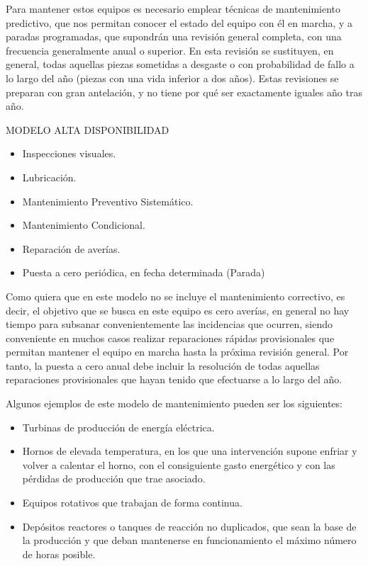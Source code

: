 \documentclass[../main]{subfiles}
\begin{document}
Para mantener
estos equipos es necesario emplear técnicas de mantenimiento predictivo,
que nos permitan conocer el estado del equipo con él en marcha, y a paradas
programadas, que supondrán una revisión general completa, con una frecuencia generalmente anual o superior. En esta revisión se sustituyen, en general, todas aquellas piezas sometidas a desgaste o con probabilidad de fallo
a lo largo del año (piezas con una vida inferior a dos años). Estas revisiones
se preparan con gran antelación, y no tiene por qué ser exactamente iguales
año tras año.
\begin{tcolorbox}
MODELO ALTA DISPONIBILIDAD
\tcblower
\begin{itemize}
\item Inspecciones visuales.
\item Lubricación.
\item Mantenimiento Preventivo Sistemático.
\item Mantenimiento Condicional.
\item Reparación de averías.
\item Puesta a cero periódica, en fecha determinada (Parada)
\end{itemize}
\end{tcolorbox}
Como quiera que en este modelo no se incluye el mantenimiento correctivo, es decir, el objetivo que se busca en este equipo es cero averías, en
general no hay tiempo para subsanar convenientemente las incidencias que
ocurren, siendo conveniente en muchos casos realizar reparaciones rápidas
provisionales que permitan mantener el equipo en marcha hasta la próxima
revisión general. Por tanto, la puesta a cero anual debe incluir la resolución
de todas aquellas reparaciones provisionales que hayan tenido que efectuarse
a lo largo del año.

Algunos ejemplos de este modelo de mantenimiento pueden ser los siguientes:


\begin{itemize}
    \item Turbinas de producción de energía eléctrica. 
    \item Hornos de elevada temperatura, en los que una intervención supone
enfriar y volver a calentar el horno, con el consiguiente gasto energético y con las pérdidas de producción que trae asociado.
    \item Equipos rotativos que trabajan de forma continua.
    \item Depósitos reactores o tanques de reacción no duplicados, que sean la
base de la producción y que deban mantenerse en funcionamiento el
máximo número de horas posible.
\end{itemize}
\end{document}
